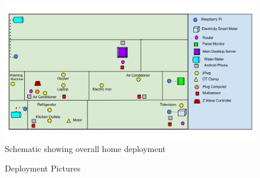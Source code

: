 \documentclass[10pt]{sensys-proc}
\begin{document}
\begin{figure}     
    \includegraphics[scale=0.4]{./figures/overall_deployment.jpg}    
    \caption{Schematic showing overall home deployment}   
    \label{fig:overall}
   
\end{figure}


\begin{figure} 
    

    \caption{Deployment Pictures}

    \label{fig:deployment}

\end{figure}
\end{document}
